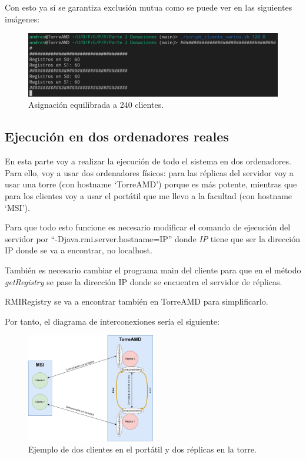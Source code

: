 \documentclass{article}
\begin{document}
Con esto ya sí se garantiza exclusión mutua como se puede ver en las siguientes imágenes:

\begin{figure}[H]
    \centering
    \includegraphics[width=\textwidth]{imagenes/varios/correcto.png}
    \caption{Asignación equilibrada a 240 clientes.}
\end{figure}

\subsection{Ejecución en dos ordenadores reales}
En esta parte voy a realizar la ejecución de todo el sistema en dos ordenadores. Para ello, voy a usar dos ordenadores físicos: para las réplicas del servidor voy a usar una torre (con hostname `TorreAMD') porque es más potente, mientras que para los clientes voy a usar el portátil que me llevo a la facultad (con hostname `MSI').

Para que todo esto funcione es necesario modificar el comando de ejecución del servidor por ``-Djava.rmi.server.hostname=IP'' donde \textit{IP} tiene que ser la dirección IP donde se va a encontrar, no localhost.

También es necesario cambiar el programa main del cliente para que en el método \textit{getRegistry} se pase la dirección IP donde se encuentra el servidor de réplicas.

RMIRegistry se va a encontrar también en TorreAMD para simplificarlo.

Por tanto, el diagrama de interconexiones sería el siguiente:

\begin{figure}[H]
    \centering
    \includegraphics[width=0.5\textwidth]{imagenes/variosOrdenadores.png}
    \caption{Ejemplo de dos clientes en el portátil y dos réplicas en la torre.}
\end{figure}
\end{document}
